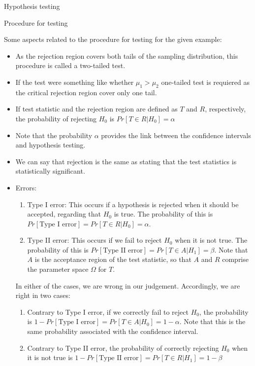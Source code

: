 \documentclass[8pt]{beamer}
\renewcommand{\emph}[1]{\textcolor{myorange}{#1}}
\begin{document}
\begin{frame}{Hypothesis testing}

    \begin{block}{Procedure for testing}
    \end{block}
    \vspace{-5pt}
    Some aspects related to the procedure for testing for the given example:
    \begin{itemize}
        \item As the \emph{rejection region} covers \emph{both tails} of the \emph{sampling distribution}, this procedure is called a \alert{two-tailed test}.
        \item If the test were something like whether $\mu_1 > \mu_2$ \alert{one-tailed test} is requiered as the critical \emph{rejection region} cover only one tail. 
        \item If \emph{test statistic} and the \emph{rejection region} are defined as $T$ and $R$, respectively, the probability of rejecting $H_0$ is $Pr\left[T \in R | H_0\right] = \alpha$
        \item Note that the probability $\alpha$ provides the link between the \emph{confidence intervals} and \emph{hypothesis testing}.
        \item We can say that \emph{rejection} is the same as stating that the \emph{test statistics} is \emph{statistically significant}.
        \item Errors:
            \begin{enumerate}
                \item \alert{Type I error}: This occurs if a hypothesis is rejected when it should be accepted, regarding that $H_0$ is true. The probability of this is $Pr \left[ \text{Type I error} \right] = Pr\left[T \in R | H_0\right] = \alpha$.
                \item \alert{Type II error}: This occurs if we fail to reject $H_0$ when it is not true. The probability of this is $Pr \left[ \text{Type II error} \right] = Pr\left[T \in A | H_1\right] = \beta$. Note that $A$ is the acceptance region of the test statistic, so that $A$ and $R$ comprise the parameter space $\Omega$ for $T$. 
            \end{enumerate}
 In either of the cases, we are wrong in our judgement. Accordingly, we are right in two cases:
           \begin{enumerate}
               \item Contrary to \emph{Type I error}, if we correctly fail  to reject $H_0$, the probability is $1- Pr \left[ \text{Type I error} \right] = Pr\left[T \in A | H_0\right] = 1-\alpha$. Note that this is the same probability associated with the \emph{confidence interval}. 
               \item Contrary to \emph{Type II error}, the probability of correctly rejecting $H_0$ when it is not true is $1- Pr \left[ \text{Type II error} \right] = Pr\left[T \in R | H_1\right] = 1-\beta$
            \end{enumerate}
    \end{itemize}
\end{frame}
\end{document}
